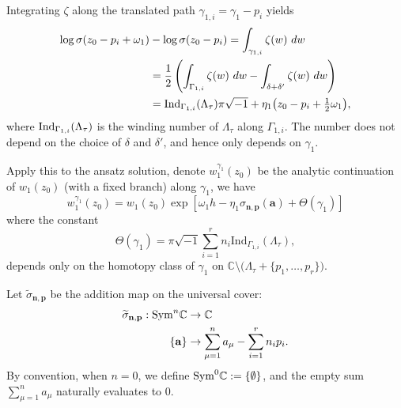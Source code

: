 \documentclass[11pt]{amsart}
\theoremstyle{remark}
\numberwithin{equation}{section}
\newcommand{\Sym}{{\rm Sym}}
\begin{document}
\begin{center}
\begin{figure}[ht!]
\end{figure}
\end{center}

Integrating $\zeta$ along the translated path $\gamma_{1,i} = \gamma_1 - p_i$ yields
\[
\begin{split}
\log \sigma(z_0-p_i+\omega_1) & - \log \sigma(z_0-p_i) = \int_{\gamma_{1,i}} \zeta(w)\ dw 
\\
&= \frac{1}{2}\left(\int_{\Gamma_{1,i}} \zeta(w)\ dw - \int_{\delta+\delta'} \zeta(w)\ dw\right) \\
&= {\rm Ind}_{\Gamma_{1,i}}(\Lambda_\tau)\pi\sqrt{-1} + \eta_1\big(z_0-p_i + \tfrac{1}{2}\omega_1\big),
\end{split}
\]
where 
${\rm Ind}_{\Gamma_{1,i}}(\Lambda_\tau)$
is the winding number of $\Lambda_\tau$ along $\Gamma_{1,i}$. The number does not depend on the choice of $\delta$ and $\delta'$, and hence only depends on $\gamma_1$. 

Apply this to the ansatz solution, denote $w_1^{\gamma_1}(z_0)$ be the analytic continuation of $w_1(z_0)$ (with a fixed branch) along $\gamma_1$, we have
\begin{equation} \label{e:analy_conti}
w_1^{\gamma_1}(z_0) = w_1(z_0) \exp\left[ \omega_1 h - \eta_1 \sigma_{\mathbf{n},\mathbf{p}}(\mathbf{a}) + \Theta(\gamma_1) \right]
\end{equation}
where the constant
\[
\Theta(\gamma_1) = \pi \sqrt{-1} \sum_{i=1}^r n_i \text{Ind}_{\Gamma_{1,i}}(\Lambda_\tau),
\] 
depends only on the homotopy class of $\gamma_1$ on $\mathbb{C} \setminus\Big( \Lambda_\tau + \{ p_1,\dots,p_r \}\Big)$. 

Let $\widetilde{\sigma}_{\mathbf{n},\mathbf{p}}$ be the addition map on the universal cover:
\[
\begin{split}
    \widetilde{\sigma}_{\mathbf{n},\mathbf{p}}: \Sym^n \mathbb{C} &\rightarrow \mathbb{C}
    \\
    \{ \mathbf{a} \} & \rightarrow \sum_{\mu=1}^n a_\mu - \sum_{i=1}^r n_ip_i. 
\end{split}
\]
By convention, when $n=0$, we define $\Sym^0 \mathbb{C} := \{\emptyset\}$, and the empty sum $\sum_{\mu=1}^n a_\mu$ naturally evaluates to $0$.
\end{document}
